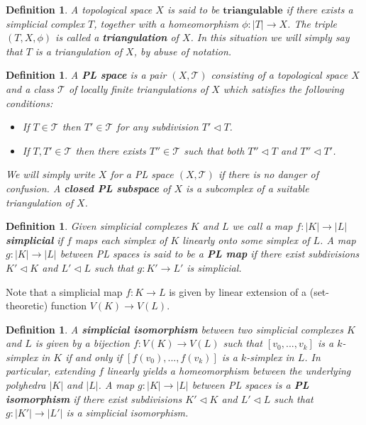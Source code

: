 \documentclass{scrreprt}
\newtheorem{definition}[prop]{Definition}
\begin{document}
\begin{definition}
A topological space $X$ is said to be $\mathbf{triangulable}$ if there exists a simplicial complex $T$, together with a homeomorphism $\phi : |T| \to X$. The triple $(T,X, \phi)$ is called a \textbf{triangulation} of $X$. In this situation we will simply say that $T$ is a triangulation of $X$, by abuse of notation.
\end{definition}


\begin{definition}
A \textbf{PL space} is a pair $(X,\mathcal{T})$ consisting of a topological space $X$ and a class $\mathcal{T}$ of locally finite triangulations of $X$ which satisfies the following conditions:
\begin{itemize}
\item If $T \in \mathcal{T}$ then $T' \in \mathcal{T}$ for any subdivision $T' \lhd T$.
\item If $T,T' \in \mathcal{T}$ then there exists $T'' \in \mathcal{T}$ such that both $T'' \lhd T$ and $T'' \lhd T'$.
\end{itemize}
We will simply write $X$ for a PL space $(X,\mathcal{T})$ if there is no danger of confusion. A \textbf{closed PL subspace} of $X$ is a subcomplex of a suitable triangulation of $X$.
\end{definition}

\begin{definition}
Given simplicial complexes $K$ and $L$ we call a map $f: |K| \to |L|$ \textbf{simplicial} if $f$ maps each simplex of $K$ linearly onto some simplex of $L$. A map \\ $g: |K| \to |L|$ between PL spaces  is said to be a \textbf{PL map} if there exist subdivisions $K' \lhd K$ and $L' \lhd L$ such that $g: K' \to L' $ is simplicial.
\end{definition}
Note that a simplicial map $f: K \to L$ is given by linear extension of a (set-theoretic) function $V(K) \to V(L)$.

\begin{definition}
A \textbf{simplicial isomorphism} between two simplicial complexes $K$ and $L$ is given by a bijection $f : V(K) \to V(L)$ such that $[v_0,...,v_k]$ is a $k$-simplex in $K$ if and only if $[f(v_0),...,f(v_k)]$ is a $k$-simplex in $L$. In particular, extending $f$ linearly yields a homeomorphism between the underlying polyhedra $|K|$ and $|L|$. A map $g: |K| \to |L|$ between PL spaces is a \textbf{PL isomorphism} if there exist subdivisions $K' \lhd K$ and $L' \lhd L$ such that $g: |K'| \to |L'|$ is a simplicial isomorphism.
\end{definition}
\end{document}
